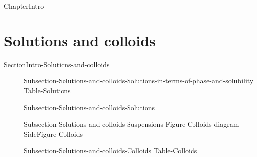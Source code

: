 \documentclass[main.tex]{subfiles}
\newcommand\chapterlabel{Ch-solutions}\setcounter{figurenewcounter}{0}\setcounter{tablenewcounter}{0}\setcounter{formulanewcounter}{0}\chapterpicture{../{\chapterlabel}/figure1}\chapterpicturelabel{PxFuel}
\begin{document}
  


{ChapterIntro}


%
%
%
%
%



\section{Solutions and colloids}{SectionIntro-Solutions-and-colloids}
\sloppy \begin{description}
\item[] {Subsection-Solutions-and-colloids-Solutions-in-terms-of-phase-and-solubility}
{Table-Solutions}
\item[] {Subsection-Solutions-and-colloids-Solutions}
\item[] 
{Subsection-Solutions-and-colloids-Suspensions}
{Figure-Colloids-diagram}
{SideFigure-Colloids}
\item[] {Subsection-Solutions-and-colloids-Colloids}
{Table-Colloids}
\end{description}
\end{document}
